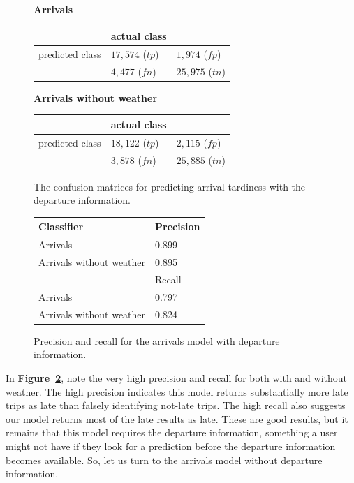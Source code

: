 \documentclass[11pt]{article} %
\begin{document}
\begin{figure}
    \textbf{Arrivals}

    \begin{tabular}[h]{l|ll}
                         & actual class &  \\
         \hline
         predicted class & $17,574 $ ($tp$)& $1,974$ ($fp$)\\
                         & $4,477$ ($fn$)& $25,975$ ($tn$)\\
    \end{tabular}

    \textbf{Arrivals without weather}

    \begin{tabular}[h]{l|ll}
                         & actual class &  \\
         \hline
         predicted class & $18,122$ ($tp$)& $2,115$ ($fp$)\\
                         & $3,878$ ($fn$)& $25,885$ ($tn$)\\
    \end{tabular}
    \caption{The confusion matrices for predicting arrival tardiness with
    the departure information.}
    \label{fig:confusion_arrivals}
\end{figure}

\begin{figure}
    \begin{tabular}{l|l}
         Classifier & Precision\\
         \hline
         Arrivals & 0.899\\
         Arrivals without weather & 0.895\\
         \hline
         & Recall\\
         \hline
         Arrivals & 0.797\\
         Arrivals without weather & 0.824\\
    \end{tabular}
    \caption{Precision and recall for the arrivals model with departure 
    information.}
    \label{fig:pr_arrivals}
\end{figure}

In \textbf{Figure~\ref{fig:pr_arrivals}}, note the very high precision and 
recall for both with and without weather.  The high precision indicates this
model returns substantially more late trips as late than falsely identifying
not-late trips. The high recall also suggests our model returns most of
the late results as late. These are good results, but it remains that this
model requires the departure information, something a user might not have if they
look for a prediction before the departure information becomes available. So, let
us turn to the arrivals model without departure information.
\end{document}
